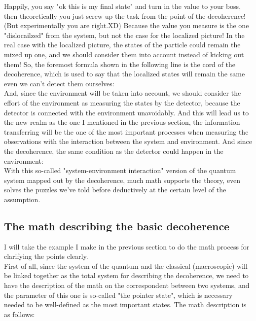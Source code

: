 \documentclass[final,1p,12pt]{elsarticle}
\begin{document}
Happily, you say "ok this is my final state" and turn in the value to your boss, then theoretically you just screw up the task from the point of the decoherence! (But experimentally you are right.XD) Because the value you measure is the one "dislocailzed" from the system, but not the case for the localized picture! In the real case with the localized picture, the states of the particle could remain the mixed up one, and we should consider them into account instead of kicking out them!  So, the foremost formula shown in the following line is the cord of the decoherence, which is used to say that the localized states will remain the same even we can't detect them ourselves:\\

And, since the environment will be taken into account, we should consider the effort of the environment as measuring the states by the detector, because the detector is connected with the environment unavoidably. And this will lead us to the new realm as the one I mentioned in the previous section, the information transferring will be the one of the most important processes when measuring the observations with the interaction between the system and environment. And since the decoherence, the same condition as the detector could happen in the environment:\\

With this so-called "system-environment interaction" version of the quantum system mapped out by the decoherence, much math supports the theory, even solves the puzzles we've told before deductively at the certain level of the assumption. 

\subsection{The math describing the basic decoherence}
I will take the example I make in the previous section to do the math process for clarifying the points clearly.\\

First of all, since the system of the quantum and the classical (macroscopic)  will be linked together as the total system for describing the decoherence, we need to have the description of the math on the correspondent between two systems, and the parameter of this one is so-called "the pointer state", which is necessary needed to be well-defined as the most important states. The math description is as follows:\\
\end{document}
